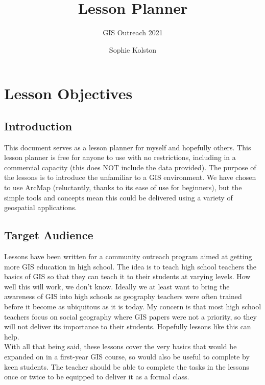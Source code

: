 \documentclass{article}
\title{Lesson Planner}
\author{GIS Outreach 2021}
\date{Sophie Kolston}
\begin{document}
\maketitle

\tableofcontents

\setlength{\parindent}{0in} 


\section{Lesson Objectives}
\subsection{Introduction}
This document serves as a lesson planner for myself and hopefully others. This lesson planner is free for anyone to use with no restrictions, including in a commercial capacity (this does NOT include the data provided). The purpose of the lessons is to introduce the unfamiliar to a GIS environment. We have chosen to use ArcMap (reluctantly, thanks to its ease of use for beginners), but the simple tools and concepts mean this could be delivered using a variety of geospatial applications.

\subsection{Target Audience}
Lessons have been written for a community outreach program aimed at getting more GIS education in high school. The idea is to teach high school teachers the basics of GIS so that they can teach it to their students at varying levels. How well this will work, we don't know. Ideally we at least want to bring the awareness of GIS into high schools as geography teachers were often trained before it become as ubiquitous as it is today. My concern is that most high school teachers focus on social geography where GIS papers were not a priority, so they will not deliver its importance to their students. Hopefully lessons like this can help. \\

With all that being said, these lessons cover the very basics that would be expanded on in a first-year GIS course, so would also be useful to complete by keen students. The teacher should be able to complete the tasks in the lessons once or twice to be equipped to deliver it as a formal class.
\end{document}

